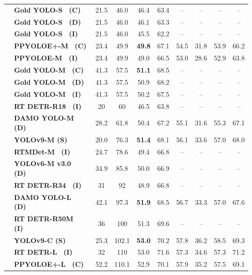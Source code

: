 \documentclass[10pt,twocolumn,letterpaper]{article}
\begin{document}
\begin{table}[t]
\begin{threeparttable}[t]
\begin{tabular}{l|lcccccccc}
				& \textbf{Gold YOLO-S~\cite{wang2023gold} (C)} & 21.5 & 46.0 & 46.4 & 63.4 & -- & -- & -- & -- \\
				& \textbf{Gold YOLO-S~\cite{wang2023gold} (D)} & 21.5 & 46.0 & 46.1 & 63.3 & -- & -- & -- & -- \\
				& \textbf{Gold YOLO-S~\cite{wang2023gold} (I)} & 21.5 & 46.0 & 45.5 & 62.2 & -- & -- & -- & -- \\
				& \textbf{PPYOLOE+-M~\cite{xu2022pp} (C)} & 23.4 & 49.9 & \textbf{49.8} & 67.1 & 54.5 & 31.8 & 53.9 & 66.2 \\
				& \textbf{PPYOLOE-M~\cite{xu2022pp} (I)} & 23.4 & 49.9 & 49.0 & 66.5 & 53.0 & 28.6 & 52.9 & 63.8 \\
				& \textbf{Gold YOLO-M~\cite{wang2023gold} (C)} & 41.3 & 57.5 & \textbf{51.1} & 68.5 & -- & -- & -- & -- \\
				& \textbf{Gold YOLO-M~\cite{wang2023gold} (D)} & 41.3 & 57.5 & 50.9 & 68.2 & -- & -- & -- & -- \\
				& \textbf{Gold YOLO-M~\cite{wang2023gold} (I)} & 41.3 & 57.5 & 50.2 & 67.5 & -- & -- & -- & -- \\
				& \textbf{RT DETR-R18~\cite{lv2023detrs} (I)} & 20 & 60 & 46.5 & 63.8 & -- & -- & -- & -- \\
				& \textbf{DAMO YOLO-M~\cite{xu2022damo} (D)} & 28.2 & 61.8 & 50.4 & 67.2 & 55.1 & 31.6 & 55.3 & 67.1 \\
				& \textbf{YOLOv9-M (S)} & 20.0 & 76.3 & \textbf{51.4} & 68.1 & 56.1 & 33.6 & 57.0 & 68.0 \\
				& \textbf{RTMDet-M~\cite{lyu2022rtmdet} (I)} & 24.7 & 78.6 & 49.4 & 66.8 & -- & -- & -- & -- \\
				& \textbf{YOLOv6-M v3.0~\cite{li2023yolov6} (D)} & 34.9 & 85.8 & 50.0 & 66.9 & -- & -- & -- & -- \\
				& \textbf{RT DETR-R34~\cite{lv2023detrs} (I)} & 31 & 92 & 48.9 & 66.8 & -- & -- & -- & -- \\
				& \textbf{DAMO YOLO-L~\cite{xu2022damo} (D)} & 42.1 & 97.3 & \textbf{51.9} & 68.5 & 56.7 & 33.3 & 57.0 & 67.6 \\
				& \textbf{RT DETR-R50M~\cite{lv2023detrs} (I)} & 36 & 100 & 51.3 & 69.6 & -- & -- & -- & -- \\
				& \textbf{YOLOv9-C (S)} & 25.3 & 102.1 & \textbf{53.0} & 70.2 & 57.8 & 36.2 & 58.5 & 69.3 \\
				& \textbf{RT DETR-L~\cite{lv2023detrs} (I)} & 32 & 110 & 53.0 & 71.6 & 57.3 & 34.6 & 57.3 & 71.2 \\
				& \textbf{PPYOLOE+-L~\cite{xu2022pp} (C)} & 52.2 & 110.1 & 52.9 & 70.1 & 57.9 & 35.2 & 57.5 & 69.1 \\

\end{tabular}
\end{threeparttable}
\end{table}
\end{document}
